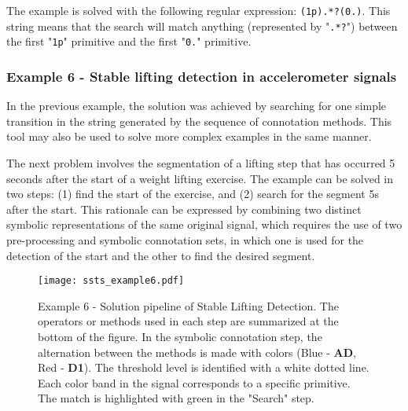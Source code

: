 \par
The example is solved with the following regular expression: \texttt{(1p).*?(0.)}. This string means that the search will match anything (represented by "\texttt{.*?}") between the first "\texttt{1p}" primitive and the first "\texttt{0.}" primitive.

\subsubsection{Example 6 - Stable lifting detection in accelerometer signals}

In the previous example, the solution was achieved by searching for one simple transition in the string generated by the sequence of connotation methods. This tool may also be used to solve more complex examples in the same manner.
\par
The next problem involves the segmentation of a lifting step that has occurred 5 seconds after the start of a weight lifting exercise. The example can be solved in two steps: (1) find the start of the exercise, and (2) search for the segment 5s after the start. This rationale can be expressed by combining two distinct symbolic representations of the same original signal, which requires the use of two pre-processing and symbolic connotation sets, in which one is used for the detection of the start and the other to find the desired segment.

\begin{figure}
  \centering
      \texttt{[image: ssts\_example6.pdf]}
  \caption{Example 6 - Solution pipeline of Stable Lifting Detection. The operators or methods used in each step are summarized at the bottom of the figure. In the symbolic connotation step, the alternation between the methods is made with colors (Blue - \textbf{AD}, Red - \textbf{D1}). The threshold level is identified with a white dotted line. Each color band in the signal corresponds to a specific primitive. The match is highlighted with green in the "Search" step.}
  \label{fig:Hard}
\end{figure}

